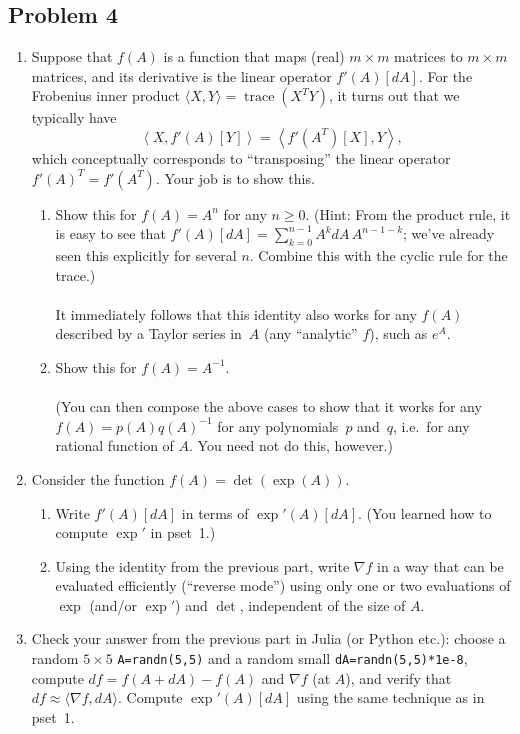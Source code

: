 \documentclass[10pt,oneside]{article}
\newcommand{\tr}{\operatorname{trace}}
\begin{document}
\subsection*{Problem 4}
\begin{enumerate}
\item Suppose that $f(A)$ is a function that maps (real) $m\times m$ matrices
to $m\times m$ matrices, and its derivative is the linear operator
$f'(A)[dA]$. For the Frobenius inner product $\langle X,Y\rangle=\tr(X^{T}Y)$,
it turns out that we typically have
\[
\left\langle X,f'(A)[Y]\right\rangle =\left\langle f'(A^{T})[X],Y\right\rangle ,
\]
which conceptually corresponds to “transposing” the linear operator
$f'(A)^{T}=f'(A^{T})$. Your job is to show this.
\begin{enumerate}
\item Show this for $f(A)=A^{n}$ for any $n\ge0$. (Hint: From the product
rule, it is easy to see that $f'(A)[dA]=\sum_{k=0}^{n-1}A^{k}dA\,A^{n-1-k}$;
we've already seen this explicitly for several $n$. Combine this
with the cyclic rule for the trace.)\\
\\
It immediately follows that this identity also works for any $f(A)$
described by a Taylor series in~$A$ (any ``analytic'' $f$), such
as $e^{A}$.
\item Show this for $f(A)=A^{-1}$.\\
\\
(You can then compose the above cases to show that it works for any
$f(A)=p(A)q(A)^{-1}$ for any polynomials~$p$ and~$q$, i.e.~for
any rational function of $A$. You need not do this, however.)
\end{enumerate}
\item Consider the function $f(A)=\det(\exp(A))$.
\begin{enumerate}
\item Write $f'(A)[dA]$ in terms of $\exp'(A)[dA]$. (You learned how to
compute $\exp'$ in pset~1.)
\item Using the identity from the previous part, write $\nabla f$ in a
way that can be evaluated efficiently (“reverse mode”) using
only one or two evaluations of $\exp$ (and/or $\exp'$) and $\det$,
independent of the size of $A$.
\end{enumerate}
\item Check your answer from the previous part in Julia (or Python etc.):
choose a random $5\times5$ \texttt{A=randn(5,5)} and a random small
\texttt{dA=randn(5,5){*}1e-8}, compute $df=f(A+dA)-f(A)$ and $\nabla f$
(at $A$), and verify that $df\approx\langle\nabla f,dA\rangle$.
Compute $\exp'(A)[dA]$ using the same technique as in pset~1.
\end{enumerate}
\end{document}
